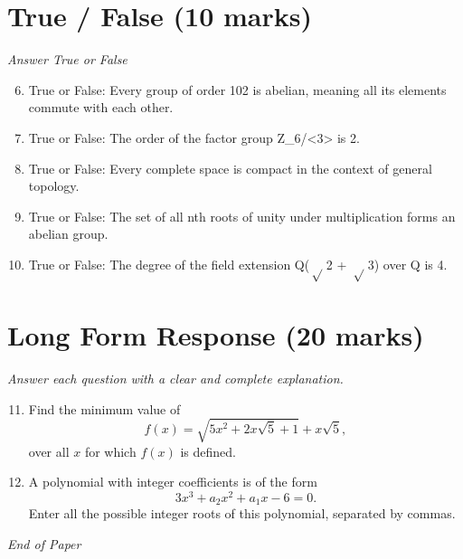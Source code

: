 \documentclass[12pt]{article}
\begin{document}
\section*{True / False (10 marks)}
\textit{Answer True or False}
\begin{enumerate}[label=\arabic*.]
\setcounter{enumi}{5}
\item True or False: Every group of order 102 is abelian, meaning all its elements commute with each other.
\item True or False: The order of the factor group Z\_6/\textless{}3\textgreater{} is 2.
\item True or False: Every complete space is compact in the context of general topology.
\item True or False: The set of all nth roots of unity under multiplication forms an abelian group.
\item True or False: The degree of the field extension Q(\ensuremath{\sqrt} 2 + \ensuremath{\sqrt} 3) over Q is 4.
\end{enumerate}

\section*{Long Form Response (20 marks)}
\textit{Answer each question with a clear and complete explanation.}
\begin{enumerate}[label=\arabic*.]
\setcounter{enumi}{10}
\item Find the minimum value of \[f(x) = \sqrt{5 x^2 + 2 x \sqrt{5} + 1} + x \sqrt{5},\]over all $x$ for which $f(x)$ is defined.
\item A polynomial with integer coefficients is of the form \[3 x^3 + a_2 x^2 + a_1 x - 6 = 0.\]Enter all the possible integer roots of this polynomial, separated by commas.
\end{enumerate}

\vfill
\noindent\textit{End of Paper}
\end{document}
